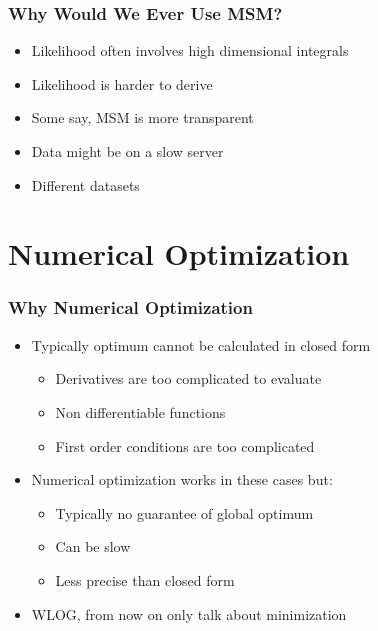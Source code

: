 \documentclass[11pt]{beamer}
\begin{document}
\begin{frame}[c]\frametitle{Why Would We Ever Use MSM?}
\begin{itemize}
    \item Likelihood often involves high dimensional integrals
    \item Likelihood is harder to derive
    \item Some say, MSM is more transparent
    \item Data might be on a slow server
    \item Different datasets
\end{itemize}
\end{frame}



\section{Numerical Optimization}


\begin{frame}[c]\frametitle{Why Numerical Optimization}
    \begin{itemize}
        \item Typically optimum cannot be calculated in closed form
        \begin{itemize}
            \item Derivatives are too complicated to evaluate
            \item Non differentiable functions
            \item First order conditions are too complicated
        \end{itemize}
        \item Numerical optimization works in these cases but:
        \begin{itemize}
            \item Typically no guarantee of global optimum
            \item Can be slow
            \item Less precise than closed form
        \end{itemize}
        \item WLOG, from now on only talk about minimization
    \end{itemize}
\end{frame}
\end{document}
